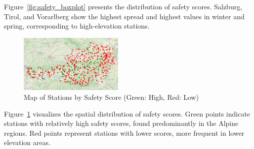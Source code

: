 Figure~\ref{fig:safety_boxplot} presents the distribution of safety scores. Salzburg, Tirol, and Vorarlberg show the highest spread and highest values in winter and spring, corresponding to high-elevation stations.

\begin{figure}[H]
    \centering
    \includegraphics[width=0.45\textwidth]{img/station_map.png}
    \caption{Map of Stations by Safety Score (Green: High, Red: Low)}
    \label{fig:station_map}
\end{figure}

Figure~\ref{fig:station_map} visualizes the spatial distribution of safety scores. Green points indicate stations with relatively high safety scores, found predominantly in the Alpine regions. Red points represent stations with lower scores, more frequent in lower elevation areas.
